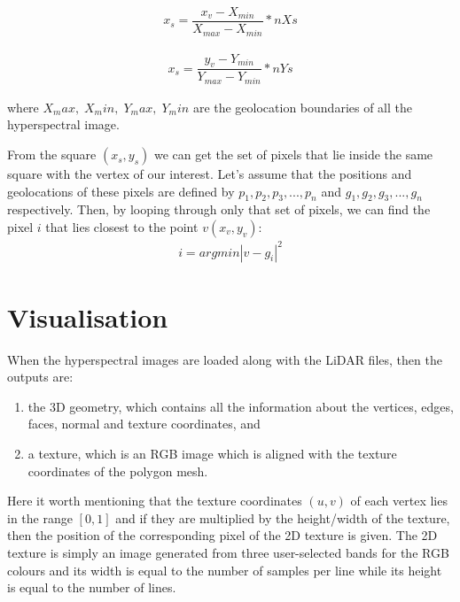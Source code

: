 \documentclass{subfiles}
\begin{document}
    \begin{eqnarray}
	    x_s = \dfrac{x_v-X_{min}}{X_{max}-X_{min}} * nXs
    \end{eqnarray}
	
	 \begin{eqnarray}
	 x_s = \dfrac{y_v-Y_{min}}{Y_{max}-Y_{min}} * nYs
	 \end{eqnarray}
 
	\par where $X_max,\; X_min,\; Y_max,\; Y_min $ are the geolocation boundaries of all the hyperspectral image.
	
	\par From the square $(x_s,y_s)$ we can get the set of pixels that lie inside the same square with the vertex of our interest. Let’s assume that the positions and geolocations of these pixels are defined by $p_1	, p_2 , p_3, ... , p_n$ and $g_1, g_2, g_3 , ... , g_n$ respectively. Then, by looping through only that set of pixels, we can find the pixel $i$ that lies closest to the point $v(x_v , y_v)$:
	\begin{eqnarray}
		i = argmin|v-g_i|^2
	\end{eqnarray}
	
	
	
		
\section{Visualisation}
	\par When the hyperspectral images are loaded along with the LiDAR files, then the outputs are: 	
	\begin{enumerate}
		\item the 3D geometry, which contains all the information about the vertices, edges, faces, normal and texture coordinates, and
		\item  a texture, which is an RGB image which is aligned with the texture coordinates of the polygon mesh.
	\end{enumerate}
	
	\par Here it worth mentioning that the texture coordinates $(u, v)$ of each vertex lies in the range $[0, 1]$ and if they are multiplied by the height/width of the texture, then the position of the corresponding pixel of the 2D texture is given. The 2D texture is simply an image generated from three user-selected bands for the RGB colours and its width is equal to the number of samples per line while its height is equal to the number of lines.
\end{document}
